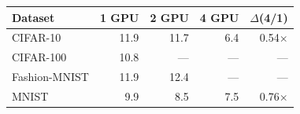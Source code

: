 \begin{tabular}{lrrrr}
\toprule
Dataset & 1 GPU & 2 GPU & 4 GPU & $\Delta$(4/1) \\
\midrule
CIFAR-10 & 11.9 & 11.7 & 6.4 & 0.54$\times$ \\
CIFAR-100 & 10.8 & — & — & — \\
Fashion-MNIST & 11.9 & 12.4 & — & — \\
MNIST & 9.9 & 8.5 & 7.5 & 0.76$\times$ \\
\bottomrule
\end{tabular}